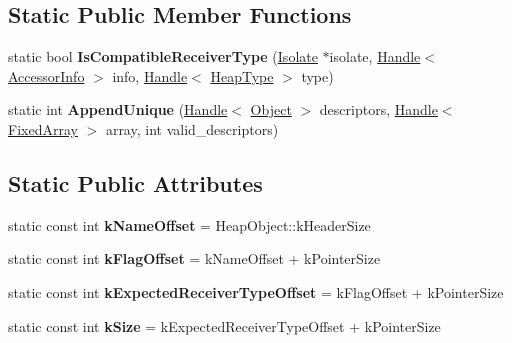 \subsection*{Static Public Member Functions}
\begin{DoxyCompactItemize}
\item 
\hypertarget{classv8_1_1internal_1_1_accessor_info_aa6b34e4e6f27b0073de22fb28ad22b65}{}static bool {\bfseries Is\+Compatible\+Receiver\+Type} (\hyperlink{classv8_1_1internal_1_1_isolate}{Isolate} $\ast$isolate, \hyperlink{classv8_1_1internal_1_1_handle}{Handle}$<$ \hyperlink{classv8_1_1internal_1_1_accessor_info}{Accessor\+Info} $>$ info, \hyperlink{classv8_1_1internal_1_1_handle}{Handle}$<$ \hyperlink{classv8_1_1internal_1_1_type_impl}{Heap\+Type} $>$ type)\label{classv8_1_1internal_1_1_accessor_info_aa6b34e4e6f27b0073de22fb28ad22b65}

\item 
\hypertarget{classv8_1_1internal_1_1_accessor_info_a10dfefe3dc1780c1ca553aec96177b1b}{}static int {\bfseries Append\+Unique} (\hyperlink{classv8_1_1internal_1_1_handle}{Handle}$<$ \hyperlink{classv8_1_1internal_1_1_object}{Object} $>$ descriptors, \hyperlink{classv8_1_1internal_1_1_handle}{Handle}$<$ \hyperlink{classv8_1_1internal_1_1_fixed_array}{Fixed\+Array} $>$ array, int valid\+\_\+descriptors)\label{classv8_1_1internal_1_1_accessor_info_a10dfefe3dc1780c1ca553aec96177b1b}

\end{DoxyCompactItemize}
\subsection*{Static Public Attributes}
\begin{DoxyCompactItemize}
\item 
\hypertarget{classv8_1_1internal_1_1_accessor_info_a75d3700bea71b63895455a5d5cc5dae9}{}static const int {\bfseries k\+Name\+Offset} = Heap\+Object\+::k\+Header\+Size\label{classv8_1_1internal_1_1_accessor_info_a75d3700bea71b63895455a5d5cc5dae9}

\item 
\hypertarget{classv8_1_1internal_1_1_accessor_info_abc6115491f2bb799141ce228267cdeb9}{}static const int {\bfseries k\+Flag\+Offset} = k\+Name\+Offset + k\+Pointer\+Size\label{classv8_1_1internal_1_1_accessor_info_abc6115491f2bb799141ce228267cdeb9}

\item 
\hypertarget{classv8_1_1internal_1_1_accessor_info_a5f52bf6fac49df3619209bcda5e68824}{}static const int {\bfseries k\+Expected\+Receiver\+Type\+Offset} = k\+Flag\+Offset + k\+Pointer\+Size\label{classv8_1_1internal_1_1_accessor_info_a5f52bf6fac49df3619209bcda5e68824}

\item 
\hypertarget{classv8_1_1internal_1_1_accessor_info_a0fbd2218bb9f31efd29c8b17d4f1908a}{}static const int {\bfseries k\+Size} = k\+Expected\+Receiver\+Type\+Offset + k\+Pointer\+Size\label{classv8_1_1internal_1_1_accessor_info_a0fbd2218bb9f31efd29c8b17d4f1908a}

\end{DoxyCompactItemize}
